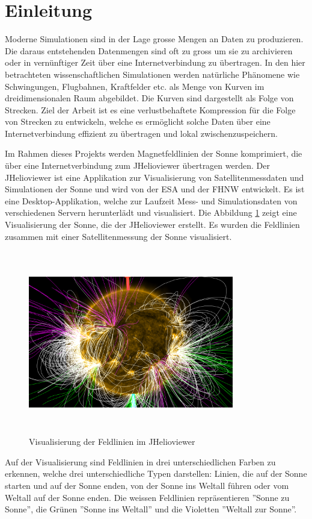\section{Einleitung}\label{einleitung}
Moderne Simulationen sind in der Lage grosse Mengen an Daten zu produzieren. Die daraus entstehenden Datenmengen sind oft zu gross um sie zu archivieren oder in vernünftiger Zeit über eine Internetverbindung zu übertragen. In den hier betrachteten wissenschaftlichen Simulationen werden natürliche Phänomene wie Schwingungen, Flugbahnen, Kraftfelder etc. als Menge von Kurven im dreidimensionalen Raum abgebildet. Die Kurven sind dargestellt als Folge von Strecken. Ziel der Arbeit ist es eine verlustbehaftete Kompression für die Folge von Strecken zu entwickeln, welche es ermöglicht solche Daten über eine Internetverbindung effizient zu übertragen und lokal zwischenzuspeichern.

Im Rahmen dieses Projekts werden Magnetfeldlinien der Sonne komprimiert, die über eine Internetverbindung zum JHelioviewer übertragen werden. Der JHelioviewer ist eine Applikation zur Visualisierung von Satellitenmessdaten und Simulationen der Sonne und wird von der ESA und der FHNW entwickelt. Es ist eine Desktop-Applikation, welche zur Laufzeit Mess- und Simulationsdaten von verschiedenen Servern herunterlädt und visualisiert. Die Abbildung \ref{einleitung::feldlinien} zeigt eine Visualisierung der Sonne, die der JHelioviewer erstellt. Es wurden die Feldlinien zusammen mit einer Satellitenmessung der Sonne visualisiert.

\begin{figure}[!htbp]
\center
	\includegraphics[width=0.8\textwidth,height=8cm,keepaspectratio]{./pictures/einleitung/fieldLines.png}
	\caption{Visualisierung der Feldlinien im JHelioviewer}
	\label{einleitung::feldlinien}
\end{figure}
Auf der Visualisierung sind Feldlinien in drei unterschiedlichen Farben zu erkennen, welche drei unterschiedliche Typen darstellen: Linien, die auf der Sonne starten und auf der Sonne enden, von der Sonne ins Weltall führen oder vom Weltall auf der Sonne enden. Die weissen Feldlinien repräsentieren ''Sonne zu Sonne'', die Grünen ''Sonne ins Weltall'' und die Violetten ''Weltall zur Sonne''.

